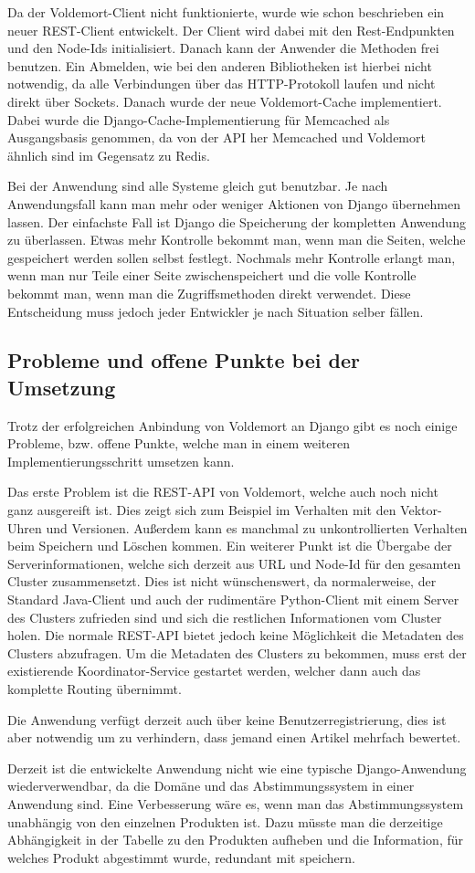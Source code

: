 Da der Voldemort-Client nicht funktionierte, wurde wie schon beschrieben ein
neuer \gls{REST}-Client entwickelt. Der Client wird dabei mit den Rest-Endpunkten
und den Node-Ids initialisiert. Danach kann der Anwender die Methoden frei
benutzen. Ein Abmelden, wie bei den anderen Bibliotheken ist hierbei nicht
notwendig, da alle Verbindungen über das HTTP-Protokoll laufen und nicht direkt
über Sockets. Danach wurde der neue Voldemort-Cache implementiert. Dabei wurde
die Django-Cache-Implementierung für Memcached als Ausgangsbasis genommen, da
von der API her Memcached und Voldemort ähnlich sind im Gegensatz zu Redis.

Bei der Anwendung sind alle Systeme gleich gut benutzbar. Je nach Anwendungsfall
kann man mehr oder weniger Aktionen von Django übernehmen lassen. Der einfachste
Fall ist Django die Speicherung der kompletten Anwendung zu überlassen. Etwas
mehr Kontrolle bekommt man, wenn man die Seiten, welche gespeichert werden
sollen selbst festlegt. Nochmals mehr Kontrolle erlangt man, wenn man nur Teile
einer Seite zwischenspeichert und die volle Kontrolle bekommt man, wenn man die
Zugriffsmethoden direkt verwendet. Diese Entscheidung muss jedoch jeder
Entwickler je nach Situation selber fällen.

\subsection{Probleme und offene Punkte bei der Umsetzung}
Trotz der erfolgreichen Anbindung von Voldemort an Django gibt es noch einige
Probleme, bzw. offene Punkte, welche man in einem weiteren
Implementierungsschritt umsetzen kann.

Das erste Problem ist die \gls{REST}-API von Voldemort, welche auch noch nicht
ganz ausgereift ist. Dies zeigt sich zum Beispiel im Verhalten mit den
Vektor-Uhren und Versionen. Außerdem kann es manchmal zu unkontrollierten
Verhalten beim  Speichern und Löschen kommen. Ein weiterer Punkt ist die Übergabe
der Serverinformationen, welche sich derzeit aus URL und Node-Id für den gesamten
Cluster zusammensetzt. Dies ist nicht wünschenswert, da normalerweise, der
Standard Java-Client und auch der rudimentäre Python-Client mit einem Server
des Clusters zufrieden sind und sich die restlichen Informationen vom Cluster
holen. Die normale REST-API bietet jedoch keine Möglichkeit die Metadaten des
Clusters abzufragen. Um die Metadaten des Clusters zu bekommen, muss erst der
existierende Koordinator-Service gestartet werden, welcher dann auch das
komplette Routing übernimmt.

Die Anwendung verfügt derzeit auch über keine Benutzerregistrierung, dies ist
aber notwendig um zu verhindern, dass jemand einen Artikel mehrfach bewertet.

Derzeit ist die entwickelte Anwendung nicht wie eine typische Django-Anwendung
wiederverwendbar, da die Domäne und das Abstimmungssystem in einer Anwendung sind.
Eine Verbesserung wäre es, wenn man das Abstimmungssystem unabhängig von den
einzelnen Produkten ist. Dazu müsste man die derzeitige Abhängigkeit in der
Tabelle zu den Produkten aufheben und die Information, für welches Produkt
abgestimmt wurde, redundant mit speichern.
